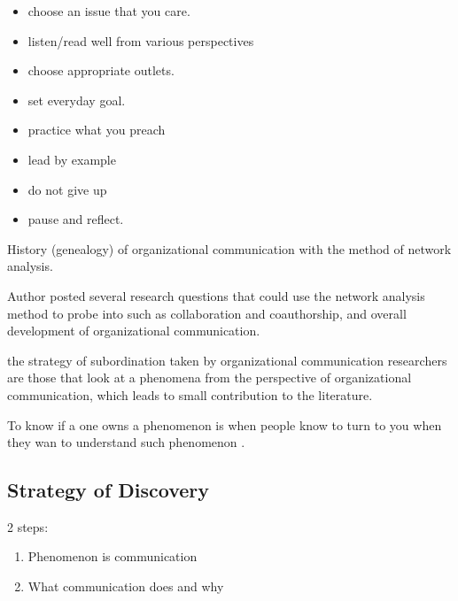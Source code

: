\documentclass[
]{book}
\providecommand{\tightlist}{%
  \setlength{\itemsep}{0pt}\setlength{\parskip}{0pt}}
\begin{document}
\begin{itemize}
\tightlist
\item
  choose an issue that you care.\\
\item
  listen/read well from various perspectives\\
\item
  choose appropriate outlets.\\
\item
  set everyday goal.\\
\item
  practice what you preach\\
\item
  lead by example\\
\item
  do not give up\\
\item
  pause and reflect.
\end{itemize}

\citep{DUrso_2014}

History (genealogy) of organizational communication with the method of network analysis.

Author posted several research questions that could use the network analysis method to probe into such as collaboration and coauthorship, and overall development of organizational communication.

\citep{Leonardi_2016}

the strategy of subordination taken by organizational communication researchers are those that look at a phenomena from the perspective of organizational communication, which leads to small contribution to the literature.

To know if a one owns a phenomenon is when people know to turn to you when they wan to understand such phenomenon .

\hypertarget{strategy-of-discovery}{%
\subsection{Strategy of Discovery}\label{strategy-of-discovery}}

2 steps:

\begin{enumerate}
\def\labelenumi{\arabic{enumi}.}
\tightlist
\item
  Phenomenon is communication\\
\item
  What communication does and why
\end{enumerate}
\end{document}
